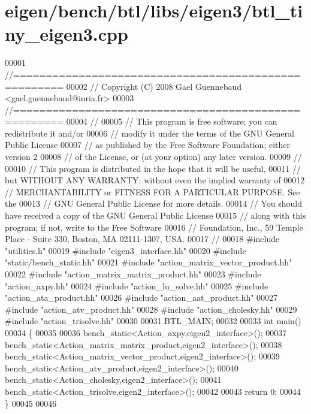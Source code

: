 \hypertarget{eigen_2bench_2btl_2libs_2eigen3_2btl__tiny__eigen3_8cpp_source}{}\section{eigen/bench/btl/libs/eigen3/btl\+\_\+tiny\+\_\+eigen3.cpp}
\label{eigen_2bench_2btl_2libs_2eigen3_2btl__tiny__eigen3_8cpp_source}

\begin{DoxyCode}
00001 \textcolor{comment}{//=====================================================}
00002 \textcolor{comment}{// Copyright (C) 2008 Gael Guennebaud <gael.guennebaud@inria.fr>}
00003 \textcolor{comment}{//=====================================================}
00004 \textcolor{comment}{//}
00005 \textcolor{comment}{// This program is free software; you can redistribute it and/or}
00006 \textcolor{comment}{// modify it under the terms of the GNU General Public License}
00007 \textcolor{comment}{// as published by the Free Software Foundation; either version 2}
00008 \textcolor{comment}{// of the License, or (at your option) any later version.}
00009 \textcolor{comment}{//}
00010 \textcolor{comment}{// This program is distributed in the hope that it will be useful,}
00011 \textcolor{comment}{// but WITHOUT ANY WARRANTY; without even the implied warranty of}
00012 \textcolor{comment}{// MERCHANTABILITY or FITNESS FOR A PARTICULAR PURPOSE.  See the}
00013 \textcolor{comment}{// GNU General Public License for more details.}
00014 \textcolor{comment}{// You should have received a copy of the GNU General Public License}
00015 \textcolor{comment}{// along with this program; if not, write to the Free Software}
00016 \textcolor{comment}{// Foundation, Inc., 59 Temple Place - Suite 330, Boston, MA  02111-1307, USA.}
00017 \textcolor{comment}{//}
00018 \textcolor{preprocessor}{#include "utilities.h"}
00019 \textcolor{preprocessor}{#include "eigen3\_interface.hh"}
00020 \textcolor{preprocessor}{#include "static/bench\_static.hh"}
00021 \textcolor{preprocessor}{#include "action\_matrix\_vector\_product.hh"}
00022 \textcolor{preprocessor}{#include "action\_matrix\_matrix\_product.hh"}
00023 \textcolor{preprocessor}{#include "action\_axpy.hh"}
00024 \textcolor{preprocessor}{#include "action\_lu\_solve.hh"}
00025 \textcolor{preprocessor}{#include "action\_ata\_product.hh"}
00026 \textcolor{preprocessor}{#include "action\_aat\_product.hh"}
00027 \textcolor{preprocessor}{#include "action\_atv\_product.hh"}
00028 \textcolor{preprocessor}{#include "action\_cholesky.hh"}
00029 \textcolor{preprocessor}{#include "action\_trisolve.hh"}
00030 
00031 BTL\_MAIN;
00032 
00033 \textcolor{keywordtype}{int} main()
00034 \{
00035 
00036   bench\_static<Action\_axpy,eigen2\_interface>();
00037   bench\_static<Action\_matrix\_matrix\_product,eigen2\_interface>();
00038   bench\_static<Action\_matrix\_vector\_product,eigen2\_interface>();
00039   bench\_static<Action\_atv\_product,eigen2\_interface>();
00040   bench\_static<Action\_cholesky,eigen2\_interface>();
00041   bench\_static<Action\_trisolve,eigen2\_interface>();
00042 
00043   \textcolor{keywordflow}{return} 0;
00044 \}
00045 
00046 
\end{DoxyCode}
